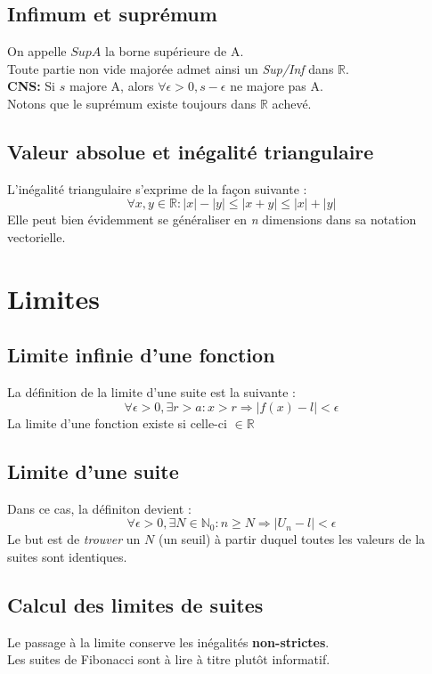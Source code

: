 \documentclass[british,french,11pt, a4paper, openany]{book}
\begin{document}
\section{Infimum et suprémum}
On appelle $SupA$ la borne supérieure de A.\\
Toute partie non vide  majorée admet ainsi un \textit{Sup/Inf} dans $\mathbb{R}$.\\
\textbf{CNS:} Si $s$ majore A, alors $\forall \epsilon > 0, s- \epsilon $ ne majore pas A.\\
Notons que le suprémum existe toujours dans $\mathbb{R}$ achevé.

\section{Valeur absolue et inégalité triangulaire}
L'inégalité triangulaire s'exprime de la façon suivante :
$$ \forall x, y \in \mathbb{R} : |x| - |y| \leq |x + y| \leq |x| + |y| $$
Elle peut bien évidemment se généraliser en \textit{n} dimensions dans sa notation vectorielle.

\chapter{Limites}
\section{Limite infinie d'une fonction}
La définition de la limite d'une suite est la suivante :
$$ \forall \epsilon > 0, \exists r > a : x > r \Rightarrow |f(x) - l| < \epsilon $$
La limite d'une fonction existe si celle-ci $\in \mathbb{R}$

\section{Limite d'une suite}
Dans ce cas, la définiton devient :
$$ \forall \epsilon > 0, \exists N \in \mathbb{N}_{0} : n \geq N \Rightarrow |U_{n} - l| < \epsilon$$
Le but est de \textit{trouver} un $N$ (un seuil) à partir duquel toutes les valeurs de la suites sont identiques.\\


\section*{Calcul des limites de suites}
Le passage à la limite conserve les inégalités \textbf{non-strictes}.\\
Les suites de Fibonacci sont à lire à titre plutôt informatif.
\end{document}
